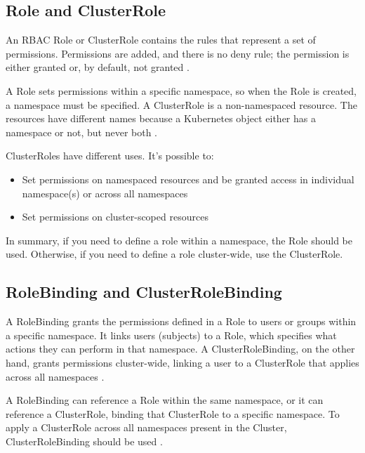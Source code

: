 \documentclass[a4paper,11pt,openright,BCOR=15mm]{scrbook}
\begin{document}
\subsection{Role and ClusterRole}

An RBAC Role or ClusterRole contains the rules that represent a set of permissions. Permissions are added, and there is no deny rule; the permission is either granted or, by default, not granted \cite{the_linux_foundation_rbacauthorization_2024}.

A Role sets permissions within a specific namespace, so when the Role is created, a namespace must be specified. A ClusterRole is a non-namespaced resource. The resources have different names because a Kubernetes object either has a namespace or not, but never both \cite{the_linux_foundation_rbacauthorization_2024}.

ClusterRoles have different uses. It's possible to:

\begin{itemize}
	\item Set permissions on namespaced resources and be granted access in individual namespace(s) or across all namespaces
	\item Set permissions on cluster-scoped resources
\end{itemize}

In summary, if you need to define a role within a namespace, the Role should be used. Otherwise, if you need to define a role cluster-wide, use the ClusterRole.


\subsection{RoleBinding and ClusterRoleBinding}

A RoleBinding grants the permissions defined in a Role to users or groups within a specific namespace. It links users (subjects) to a Role, which specifies what actions they can perform in that namespace. A ClusterRoleBinding, on the other hand, grants permissions cluster-wide, linking a user to a ClusterRole that applies across all namespaces \cite{the_linux_foundation_rbacauthorization_2024}.

A RoleBinding can reference a Role within the same namespace, or it can reference a ClusterRole, binding that ClusterRole to a specific namespace. To apply a ClusterRole across all namespaces present in the Cluster, ClusterRoleBinding should be used \cite{the_linux_foundation_rbacauthorization_2024}.
\end{document}
